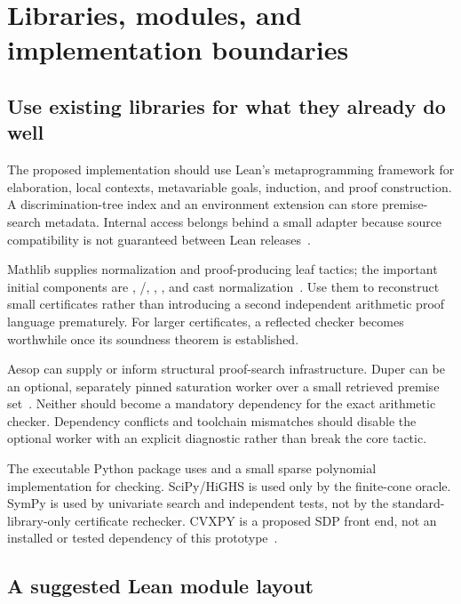 \section{Libraries, modules, and implementation boundaries}

\subsection{Use existing libraries for what they already do well}

The proposed implementation should use Lean's metaprogramming framework for elaboration, local contexts, metavariable goals, induction, and proof construction. A discrimination-tree index and an environment extension can store premise-search metadata. Internal  access belongs behind a small adapter because source compatibility is not guaranteed between Lean releases~\cite{grindtypes,grindconfig}.

Mathlib supplies normalization and proof-producing leaf tactics; the important initial components are , /, , , and cast normalization~\cite{ring,linarith,positivity}. Use them to reconstruct small certificates rather than introducing a second independent arithmetic proof language prematurely. For larger certificates, a reflected checker becomes worthwhile once its soundness theorem is established.

Aesop can supply or inform structural proof-search infrastructure. Duper can be an optional, separately pinned saturation worker over a small retrieved premise set~\cite{aesop,duper}. Neither should become a mandatory dependency for the exact arithmetic checker. Dependency conflicts and toolchain mismatches should disable the optional worker with an explicit diagnostic rather than break the core tactic.

The executable Python package uses  and a small sparse polynomial implementation for checking. SciPy/HiGHS is used only by the finite-cone oracle. SymPy is used by univariate search and independent tests, not by the standard-library-only certificate rechecker. CVXPY is a proposed SDP front end, not an installed or tested dependency of this prototype~\cite{scipy,sympy,cvxpy}.

\subsection{A suggested Lean module layout}

